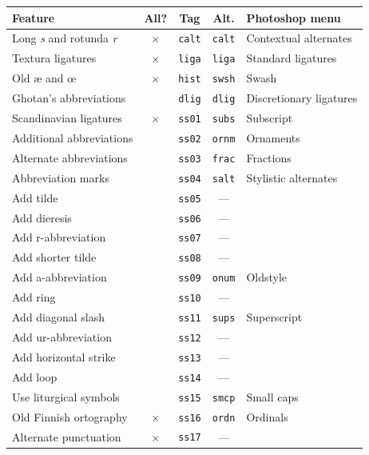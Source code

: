 \documentclass[a4paper, 12pt]{article}
\newcommand{\feature}[1]{\texttt{#1}}
\begin{document}
\begin{table}
  \centering
  \begin{tabular}{l|c|c|c|l}
    \textbf{Feature} & \textbf{All?} & \textbf{Tag} & \textbf{Alt.} & \textbf{Photoshop menu} \\
    \hline
    Long \emph{s} and rotunda \emph{r} & $\times$ & \feature{calt} &
    \feature{calt} & Contextual alternates \\
    Textura ligatures & $\times$ & \feature{liga} & \feature{liga} & Standard ligatures \\
    Old æ and œ & $\times$ & \feature{hist} & \feature{swsh} & Swash
    \\
    Ghotan's abbreviations & & \feature{dlig} & \feature{dlig} &
    Discretionary ligatures \\
    Scandinavian ligatures &  $\times$ & \feature{ss01} & \feature{subs} &
    Subscript \\
    \hline
    Additional abbreviations & & \feature{ss02} & \feature{ornm} &
    Ornaments \\
    Alternate abbreviations & & \feature{ss03} & \feature{frac} &
    Fractions \\
    Abbreviation marks & & \feature{ss04} & \feature{salt} &
    Stylistic alternates \\
    Add tilde & & \feature{ss05}  & — &  \\
    Add dieresis & & \feature{ss06} & — &  \\
    \hline
    Add r-abbreviation & & \feature{ss07} & — & \\
    Add shorter tilde & & \feature{ss08} & — & \\
    Add a-abbreviation & & \feature{ss09} & \feature{onum} & Oldstyle
    \\
    Add ring & & \feature{ss10} & — & \\
    Add diagonal slash & & \feature{ss11} & \feature{sups} &
    Superscript \\
    \hline
    Add ur-abbreviation & & \feature{ss12} & — & \\
    Add horizontal strike & & \feature{ss13} & — & \\ 
    Add loop & & \feature{ss14} & — & \\
    Use liturgical symbols & & \feature{ss15} & \feature{smcp} & Small
    caps \\
    Old Finnish ortography & $\times$ & \feature{ss16} &
    \feature{ordn} & Ordinals \\
    \hline
    Alternate punctuation & $\times$ & \feature{ss17} & — &

\end{tabular}
\end{table}
\end{document}
